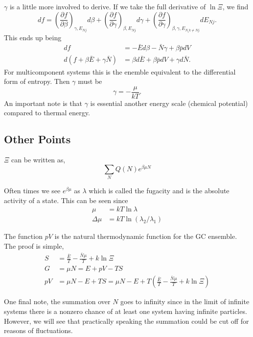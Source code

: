 $\gamma$ is a little more involved to derive. If we take the full derivative of
$\ln \Xi$, we find
\begin{equation*}
	df = \left(\frac{\partial f}{\partial \beta}\right)_{\gamma,E_{Nj}} d \beta
	+ \left(\frac{\partial f}{\partial \gamma}\right)_{\beta,E_{Nj}} d \gamma
	+ \left(\frac{\partial f}{\partial \gamma}\right)_{\beta,\gamma,E_{N_ik\neq
	Nj}} d E_{Nj}.
\end{equation*}
This ends up being
\begin{align*}
	df &= -\bar{E} d \beta - \bar{N} \gamma + \beta \bar{p} dV \\
	d(f + \beta \bar{E} + \gamma \bar{N}) &= \beta d \bar{E} + \beta \bar{p} dV
	+ \gamma d\bar{N}.
\end{align*}
For multicomponent systems this is the enemble equivalent to the differential
form of entropy. Then $\gamma$ must be
\begin{equation*}
	\gamma = -\frac{\mu}{kT}.
\end{equation*}
An important note is that $\gamma$ is essential another energy scale (chemical
potential) compared to thermal energy.

\subsection{Other Points}
$\Xi$ can be written as,
\begin{equation*}
	\sum_N{Q(N)e^{\beta\mu N}}
\end{equation*}

Often times we see $e^{\beta\mu}$ as $\lambda$ which is called the
fugacity and is the absolute activity of a state. This can be seen since
\begin{align*}
	\mu &= kT \ln \lambda \\
	\Delta \mu &= kT \ln(\lambda_2 / \lambda_1)
\end{align*}

The function $pV$ is the natural thermodynamic function for the GC ensemble. The
proof is simple,
\begin{align*}
	S &= \frac{\bar{E}}{T} - \frac{\bar{N}\mu}{T} + k\ln\Xi \\
	G &= \mu N = E + pV - TS \\
	pV &= \mu N - E + TS = \mu N - E + T ( \frac{\bar{E}}{T} -
	\frac{\bar{N}\mu}{T} + k\ln\Xi)
\end{align*}

One final note, the summation over $N$ goes to infinity since in the limit of
infinite systems there is a nonzero chance of at least one system having
infinite particles. However, we will see that practically speaking the summation
could be cut off for reasons of fluctuations.

